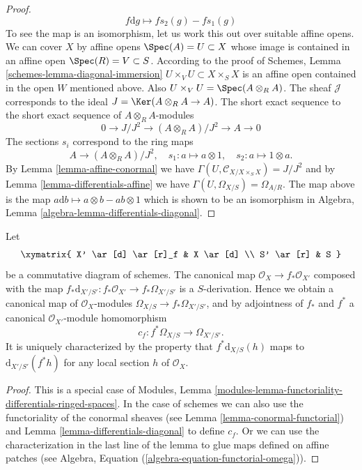 \begin{proof}
$$f\text{d}g \longmapsto fs_2(g) - fs_1(g)
$$
To see the map is an isomorphism, let us work this out over suitable affine
opens. We can cover $X$ by affine opens $\Spec(A) = U \subset X$
whose image is contained in an affine open $\Spec(R) = V \subset S$.
According to the proof of Schemes, Lemma \ref{schemes-lemma-diagonal-immersion}
$U \times_V U \subset X \times_S X$ is an affine open
contained in the open $W$ mentioned above. Also
$U \times_V U = \Spec(A \otimes_R A)$.
The sheaf $\mathcal{J}$ corresponds to the ideal
$J = \Ker(A \otimes_R A \to A)$.
The short exact sequence to the short exact sequence
of $A \otimes_R A$-modules
$$
0 \to J/J^2 \to (A \otimes_R A)/J^2 \to A \to 0
$$
The sections $s_i$ correspond to the ring maps
$$
A \longrightarrow (A \otimes_R A)/J^2,\quad
s_1 : a \mapsto a \otimes 1,\quad
s_2 : a \mapsto 1 \otimes a.
$$
By Lemma \ref{lemma-affine-conormal} we have
$\Gamma(U, \mathcal{C}_{X/X \times_S X}) = J/J^2$ and
by Lemma \ref{lemma-differentials-affine}
we have $\Gamma(U, \Omega_{X/S}) = \Omega_{A/R}$.
The map above is the map $a \text{d}b \mapsto a \otimes b - ab \otimes 1$
which is shown to be an isomorphism in
Algebra, Lemma \ref{algebra-lemma-differentials-diagonal}.
\end{proof}

\begin{lemma}
\label{lemma-functoriality-differentials}
Let
$$
\xymatrix{
X' \ar[d] \ar[r]_f & X \ar[d] \\
S' \ar[r] & S
}
$$
be a commutative diagram of schemes. The canonical map
$\mathcal{O}_X \to f_*\mathcal{O}_{X'}$ composed with the map
$f_*\text{d}_{X'/S'} : f_*\mathcal{O}_{X'} \to f_*\Omega_{X'/S'}$ is a
$S$-derivation. Hence we obtain a canonical map of $\mathcal{O}_X$-modules
$\Omega_{X/S} \to f_*\Omega_{X'/S'}$, and by
adjointness of $f_*$ and $f^*$ a
canonical $\mathcal{O}_{X'}$-module homomorphism
$$
c_f : f^*\Omega_{X/S} \longrightarrow \Omega_{X'/S'}.
$$
It is uniquely characterized by the property that
$f^*\text{d}_{X/S}(h)$ maps to $\text{d}_{X'/S'}(f^* h)$
for any local section $h$ of $\mathcal{O}_X$.
\end{lemma}

\begin{proof}
This is a special case of
Modules, Lemma \ref{modules-lemma-functoriality-differentials-ringed-spaces}.
In the case of schemes we can also use the functoriality of
the conormal sheaves (see Lemma \ref{lemma-conormal-functorial}) and
Lemma \ref{lemma-differentials-diagonal} to define $c_f$.
Or we can use the characterization in the last line of the lemma to
glue maps defined on affine patches
(see Algebra, Equation (\ref{algebra-equation-functorial-omega})).
\end{proof}

